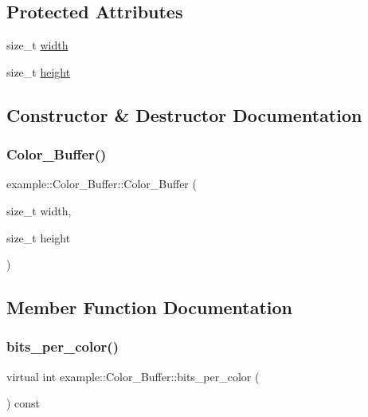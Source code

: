\subsection*{Protected Attributes}
\begin{DoxyCompactItemize}
\item 
size\+\_\+t \mbox{\hyperlink{classexample_1_1_color___buffer_ab61454d4b35cbba00d2e634d14ed20ac}{width}}
\item 
size\+\_\+t \mbox{\hyperlink{classexample_1_1_color___buffer_ae01f4538ee30af1d3072a425c5ad37ac}{height}}
\end{DoxyCompactItemize}


\subsection{Constructor \& Destructor Documentation}
\mbox{\label{classexample_1_1_color___buffer_a44c19770a14b0f8e46e7ceda1df5fc3d}} 
\subsubsection{\texorpdfstring{Color\_Buffer()}{Color\_Buffer()}}
{\footnotesize\ttfamily example\+::\+Color\+\_\+\+Buffer\+::\+Color\+\_\+\+Buffer (\begin{DoxyParamCaption}\item[{size\+\_\+t}]{width,  }\item[{size\+\_\+t}]{height }\end{DoxyParamCaption})\hspace{0.3cm}{\ttfamily [inline]}}



\subsection{Member Function Documentation}
\mbox{\label{classexample_1_1_color___buffer_a76463553dc782f2dc24a61bec708e273}} 
\subsubsection{\texorpdfstring{bits\_per\_color()}{bits\_per\_color()}}
{\footnotesize\ttfamily virtual int example\+::\+Color\+\_\+\+Buffer\+::bits\+\_\+per\+\_\+color (\begin{DoxyParamCaption}{ }\end{DoxyParamCaption}) const\hspace{0.3cm}{\ttfamily [pure virtual]}}



